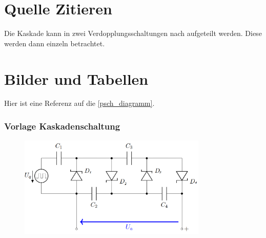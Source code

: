 \section{Quelle Zitieren}
Die Kaskade kann in zwei Verdopplungsschaltungen nach \autocite[42]{moeller} aufgeteilt werden. Diese werden dann einzeln betrachtet.

\section{Bilder und Tabellen}
Hier ist eine Referenz auf die \autoref{psch_diagramm}.
\begin{figure}[H]
	\centering
	\label{psch_diagramm}
\end{figure}

\resetlaborsectioncounter
{}
\subsubsection{Vorlage Kaskadenschaltung}
\begin{figure}[H]
	\centering
	\includegraphics[width=0.8\textwidth]{schaltung}
	\label{kaskadenschaltung}
\end{figure}


